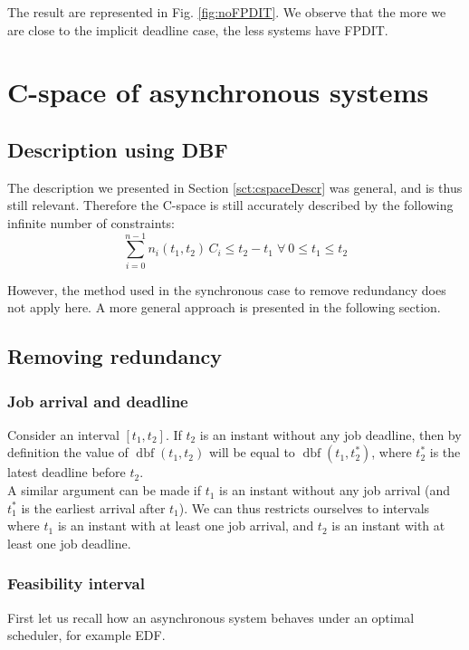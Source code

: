 \documentclass[conference]{IEEEtran}
\newcommand{\dbf}[1]{\operatorname{dbf}(#1)}
\begin{document}
  The result are represented in Fig. \ref{fig:noFPDIT}. We observe that the more we are close to the implicit deadline case, the less systems have FPDIT.

\section{C-space of asynchronous systems}
  \label{sct:asyncCspace}

  \subsection{Description using DBF}

  The description we presented in Section \ref{sct:cspaceDescr} was general, and is thus still relevant. Therefore the C-space is still accurately described by the following infinite number of constraints:$$\sum_{i=0}^{n-1} n_i(t_1, t_2) \, C_i \leq t_2 - t_1 \; \forall \: 0 \leq t_1 \leq t_2$$

  However, the method used in the synchronous case to remove redundancy does not apply here. A more general approach is presented in the following section.

  \subsection{Removing redundancy}

\subsubsection{Job arrival and deadline}

Consider an interval $[t_1, t_2]$. If $t_2$ is an instant without any job deadline, then by definition the value of $\dbf{t_1, t_2}$ will be equal to $\dbf{t_1, t_2^*}$, where $t_2^*$ is the latest deadline before $t_2$.\\

A similar argument can be made if $t_1$ is an instant without any job arrival (and $t_1^*$ is the earliest arrival after $t_1$). We can thus restricts ourselves to intervals where $t_1$ is an instant with at least one job arrival, and $t_2$ is an instant with at least one job deadline.

  \subsubsection{Feasibility interval}

  First let us recall how an asynchronous system behaves under an optimal scheduler, for example EDF.\\
\end{document}
